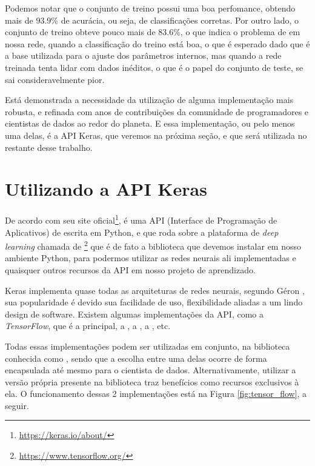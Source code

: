 Podemos notar que o conjunto de treino possui uma boa perfomance, obtendo mais de $93.9\%$ de acurácia, ou seja, de classificações corretas. Por outro lado, o conjunto de treino obteve pouco mais de $83.6\%$, o que indica o problema de  em nossa rede, quando a classificação do treino está boa, o que é esperado dado que é a base utilizada para o ajuste dos parâmetros internos, mas quando a rede treinada tenta lidar com dados inéditos, o que é o papel do conjunto de teste, se sai consideravelmente pior.

Está demonstrada a necessidade da utilização de alguma implementação mais robusta, e refinada com anos de contribuições da comunidade de programadores e cientistas de dados ao redor do planeta. E essa implementação, ou pelo menos uma delas, é a API Keras, que veremos na próxima seção, e que será utilizada no restante desse trabalho.

\section{Utilizando a API Keras}

De acordo com seu site oficial\footnote{\url{https://keras.io/about/}},  é uma API (Interface de Programação de Aplicativos) de  escrita em Python, e que roda sobre a plataforma de \emph{deep learning} chamada de \footnote{\url{https://www.tensorflow.org/}} que é de fato a biblioteca que devemos instalar em nosso ambiente Python, para podermos utilizar as redes neurais ali implementadas e quaisquer outros recursos da API  em nosso projeto de aprendizado.

Keras implementa quase todas as arquiteturas de redes neurais, segundo Géron \citep{hands}, sua popularidade é devido sua facilidade de uso, flexibilidade aliadas a um lindo design de software. Existem algumas implementações da API, como a \emph{TensorFlow}, que é a principal, a , a , a , etc. 

Todas essas implementações podem ser utilizadas em conjunto, na biblioteca conhecida como , sendo que a escolha entre uma delas ocorre de forma encapsulada até mesmo para o cientista de dados. Alternativamente, utilizar a versão própria presente na biblioteca  traz benefícios como recursos exclusivos à ela. O funcionamento dessas 2 implementações está na Figura \ref{fig:tensor_flow}, a seguir.

